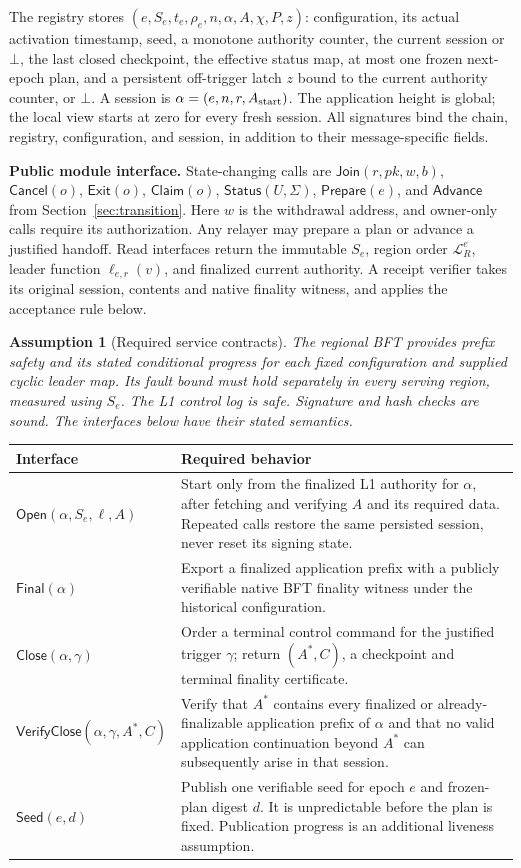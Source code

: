 \documentclass[11pt,a4paper]{article}
\newcommand{\Proc}[1]{\mathsf{#1}}
\newtheorem{assumption}{Assumption}
\begin{document}
The registry stores $(e,S_e,t_e,\rho_e,n,\alpha,A,\chi,P,z)$: configuration,
its actual activation timestamp, seed, a monotone authority counter,
the current session or $\bot$, the last closed checkpoint, the effective
status map, at most one frozen next-epoch plan, and a persistent off-trigger
latch $z$ bound to the current authority counter, or $\bot$. A session is
$\alpha=(e,n,r,A_{\rm start})$. The application height is global;
the local view starts at zero for every fresh session. All signatures bind
the chain, registry, configuration, and session, in addition to their
message-specific fields.

\textbf{Public module interface.} State-changing calls are
$\Proc{Join}(r,pk,w,b)$, $\Proc{Cancel}(o)$, $\Proc{Exit}(o)$,
$\Proc{Claim}(o)$, $\Proc{Status}(U,\Sigma)$,
$\Proc{Prepare}(e)$, and $\Proc{Advance}$ from Section~\ref{sec:transition}.
Here $w$ is the withdrawal address, and owner-only calls require its
authorization. Any relayer may prepare a plan or advance a justified
handoff. Read interfaces return the immutable $S_e$, region order
$\mathcal L_R^e$, leader function $\ell_{e,r}(v)$, and finalized current
authority. A receipt verifier takes its original session, contents and
native finality witness, and applies the acceptance rule below.

\begin{assumption}[Required service contracts]
\label{ass:services}
The regional BFT provides prefix safety and its stated conditional progress
for each fixed configuration and supplied cyclic leader map. Its fault bound
must hold separately in every serving region, measured using $S_e$.
The L1 control log is safe. Signature and hash checks are sound.
The interfaces below have their stated semantics.
\end{assumption}

\begin{tabularx}{\linewidth}{@{}p{.26\linewidth}Y@{}}
\toprule
Interface & Required behavior\\\midrule
$\Proc{Open}(\alpha,S_e,\ell,A)$ &
Start only from the finalized L1 authority for $\alpha$, after fetching
and verifying $A$ and its required data. Repeated calls restore the same
persisted session, never reset its signing state.\\
$\Proc{Final}(\alpha)$ &
Export a finalized application prefix with a publicly verifiable native
BFT finality witness under the historical configuration.\\
$\Proc{Close}(\alpha,\gamma)$ &
Order a terminal control command for the justified trigger $\gamma$;
return $(A^*,C)$, a checkpoint and terminal finality certificate.\\
$\Proc{VerifyClose}(\alpha,\gamma,A^*,C)$ &
Verify that $A^*$ contains every finalized or already-finalizable application
prefix of $\alpha$ and that no valid application continuation beyond
$A^*$ can subsequently arise in that session.\\
$\Proc{Seed}(e,d)$ &
Publish one verifiable seed for epoch $e$ and frozen-plan digest $d$.
It is unpredictable before the plan is fixed. Publication progress is
an additional liveness assumption.\\
\bottomrule
\end{tabularx}
\end{document}

